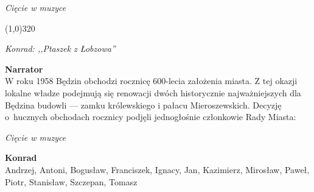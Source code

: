 \documentclass[11pt,a4paper,oneside]{article}
\begin{document}
{\color{light-gray} \emph{Cięcie w muzyce}}

\line(1,0){320}

{\color{konrad}   \emph{Konrad: ,,Ptaszek z Łobzowa''}}

\textbf{Narrator}\\
W roku 1958 Będzin obchodzi rocznicę 600-lecia założenia miasta.
Z tej okazji lokalne władze podejmują się renowacji dwóch historycznie
najważniejszych dla Będzina budowli --- zamku królewskiego i pałacu
Mieroszewskich. Decyzję o~hucznych obchodach rocznicy podjęli
jednogłośnie członkowie Rady Miasta:

{\color{light-gray} \emph{Cięcie w muzyce}}

{\color{konrad}
\textbf{Konrad}\\
Andrzej, Antoni, Bogusław, Franciszek, Ignacy, Jan, Kazimierz, Mirosław, 
Paweł, Piotr, Stanisław, Szczepan, Tomasz
}
\end{document}
